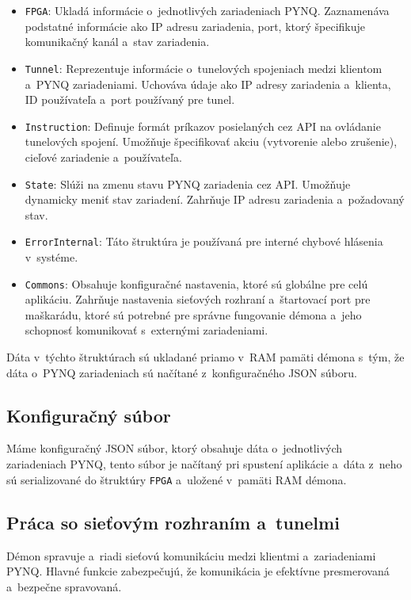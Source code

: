 \begin{itemize}
    \item \verb|FPGA|: Ukladá informácie o~jednotlivých zariadeniach PYNQ. Zaznamenáva podstatné informácie ako IP adresu zariadenia, port, ktorý špecifikuje komunikačný kanál a~stav zariadenia. 
    \item \verb|Tunnel|: Reprezentuje informácie o~tunelových spojeniach medzi klientom a~PYNQ zariadeniami. Uchováva údaje ako IP adresy zariadenia a~klienta, ID používateľa a~port používaný pre tunel.
    \item \verb|Instruction|: Definuje formát príkazov posielaných cez API na ovládanie tunelových spojení. Umožňuje špecifikovať akciu (vytvorenie alebo zrušenie), cieľové zariadenie a~používateľa.
    \item \verb|State|: Slúži na zmenu stavu PYNQ zariadenia cez API. Umožňuje dynamicky meniť stav zariadení. Zahrňuje IP adresu zariadenia a~požadovaný stav.
    \item \verb|ErrorInternal|: Táto štruktúra je používaná pre interné chybové hlásenia v~systéme. 
    \item \verb|Commons|: Obsahuje konfiguračné nastavenia, ktoré sú globálne pre celú aplikáciu. Zahrňuje nastavenia sieťových rozhraní a~štartovací port pre maškarádu, ktoré sú potrebné pre správne fungovanie démona a~jeho schopnosť komunikovať s~externými zariadeniami.
\end{itemize}

Dáta v~týchto štruktúrach sú ukladané priamo v~RAM pamäti démona s~tým, že dáta o~PYNQ zariadeniach sú načítané z~konfiguračného JSON súboru. 

\subsection{Konfiguračný súbor}

Máme konfiguračný JSON súbor, ktorý obsahuje dáta o~jednotlivých zariadeniach PYNQ, tento súbor je načítaný pri spustení aplikácie a~dáta z~neho sú serializované do štruktúry \verb|FPGA| a~uložené v~pamäti RAM démona.

\subsection{Práca so sieťovým rozhraním a~tunelmi}

Démon spravuje a~riadi sieťovú komunikáciu medzi klientmi a~zariadeniami PYNQ. Hlavné funkcie zabezpečujú, že komunikácia je efektívne presmerovaná a~bezpečne spravovaná.

